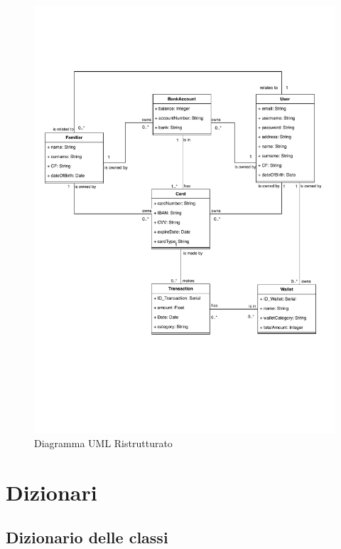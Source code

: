 \begin{figure}[!h]
    \centering
    \includegraphics[scale=0.7]{pdfs/RestructuredUMLdiagram.drawio.pdf}
    \caption{Diagramma UML Ristrutturato}\label{ResUML}
\end{figure}

\newpage
\section{Dizionari}

\subsection{Dizionario delle classi}

